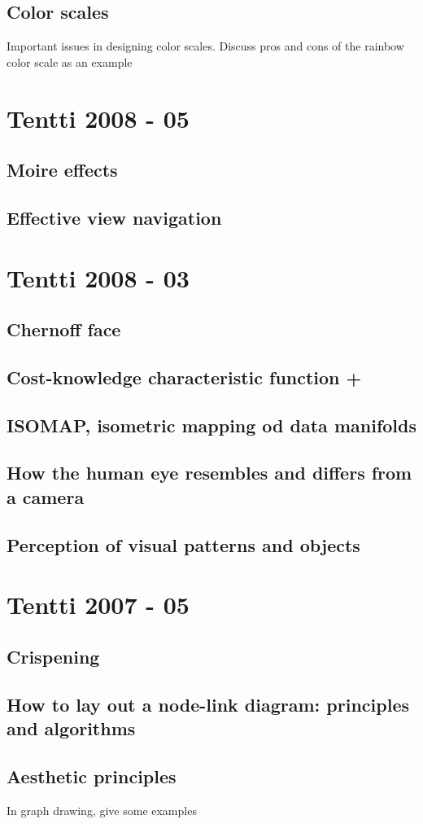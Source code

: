 \documentclass[a4paper]{article}
\begin{document}
\subsection{Color scales}

Important issues in designing color scales. Discuss pros and cons of the rainbow color scale as an example

\section{Tentti 2008 - 05}

\subsection{Moire effects}

\subsection{Effective view navigation}

\section{Tentti 2008 - 03}

\subsection{Chernoff face}

\subsection{Cost-knowledge characteristic function +}

\subsection{ISOMAP, isometric mapping od data manifolds}

\subsection{How the human eye resembles and differs from a camera}

\subsection{Perception of visual patterns and objects}

\section{Tentti 2007 - 05}

\subsection{Crispening}

\subsection{How to lay out a node-link diagram: principles and algorithms}

\subsection{Aesthetic principles}

In graph drawing, give some examples
\end{document}
